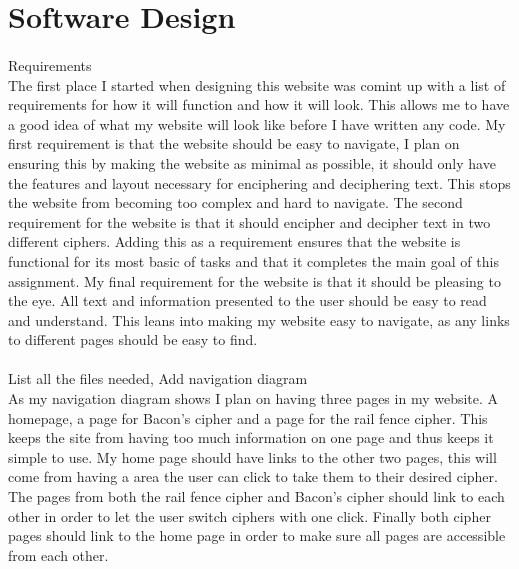 \documentclass[10pt, a4paper]{article}
\begin{document}
	\section{Software Design}
	\paragraph{}Requirements \\ The first place I started when designing this website was comint up with a list of requirements for how it will function and how it will look. This allows me to have a good idea of what my website will look like before I have written any code. My first requirement is that the website should be easy to navigate, I plan on ensuring this by making the website as minimal as possible, it should only have the features and layout necessary for enciphering and deciphering text. This stops the website from becoming too complex and hard to navigate. The second requirement for the website is that it should encipher and decipher text in two different ciphers. Adding this as a requirement ensures that the website is functional for its most basic of tasks and that it completes the main goal of this assignment. My final requirement for the website is that it should be pleasing to the eye. All text and information presented to the user should be easy to read and understand. This leans into making my website easy to navigate, as any links to different pages should be easy to find. 
	\paragraph{}List all the files needed, Add navigation diagram \\ As my navigation diagram shows I plan on having three pages in my website. A homepage, a page for Bacon's cipher and a page for the rail fence cipher. This keeps the site from having too much information on one page and thus keeps it simple to use. My home page should have links to the other two pages, this will come from having a area the user can click to take them to their desired cipher. The pages from both the rail fence cipher and Bacon's cipher should link to each other in order to let the user switch ciphers with one click. Finally both cipher pages should link to the home page in order to make sure all pages are accessible from each other.
\end{document}
